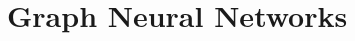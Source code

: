 \setcounter{chapter}{8}

\hypertarget{graph-neural-networks}{%
\chapter{Graph Neural Networks}\label{graph-neural-networks}}
